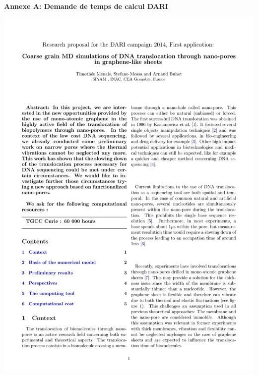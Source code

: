 \appendix


{\Large\textbf{{Annexe A: Demande de temps de calcul DARI}}}\\

{}


\begin{figure}
\label{annexea}
\end{figure}
\begin{center}
\includegraphics[width=1\textwidth , page= 1]{dari_menais_mossa_buhot.pdf}

\end{center}


